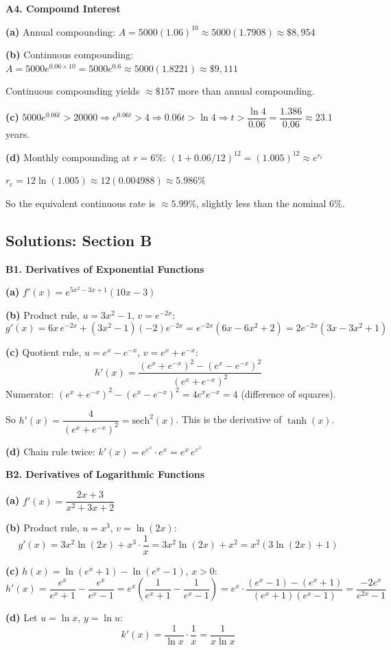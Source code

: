 \documentclass[12pt, a4paper]{article}
\theoremstyle{definition}
\begin{document}
\begin{solbox}
\textbf{A4. Compound Interest}

\textbf{(a)} Annual compounding: $A = 5000(1.06)^{10} \approx 5000(1.7908) \approx \$8{,}954$

\textbf{(b)} Continuous compounding: $A = 5000e^{0.06\times10} = 5000e^{0.6} \approx 5000(1.8221) \approx \$9{,}111$

Continuous compounding yields $\approx\$157$ more than annual compounding.

\textbf{(c)} $5000e^{0.06t} > 20000 \Rightarrow e^{0.06t} > 4 \Rightarrow 0.06t > \ln 4 \Rightarrow t > \dfrac{\ln 4}{0.06} = \dfrac{1.386}{0.06} \approx 23.1$ years.

\textbf{(d)} Monthly compounding at $r=6\%$: $(1+0.06/12)^{12} = (1.005)^{12} \approx e^{r_c}$

$r_c = 12\ln(1.005) \approx 12(0.004988) \approx 5.986\%$

So the equivalent continuous rate is $\approx 5.99\%$, slightly less than the nominal 6\%.
\end{solbox}

\subsection{Solutions: Section B}

\begin{solbox}
\textbf{B1. Derivatives of Exponential Functions}

\textbf{(a)} $f'(x) = e^{5x^2-3x+1}(10x-3)$

\textbf{(b)} Product rule, $u=3x^2-1$, $v=e^{-2x}$:
\[
  g'(x) = 6x\,e^{-2x} + (3x^2-1)(-2)e^{-2x} = e^{-2x}(6x-6x^2+2) = 2e^{-2x}(3x-3x^2+1)
\]

\textbf{(c)} Quotient rule, $u=e^x-e^{-x}$, $v=e^x+e^{-x}$:
\[
  h'(x) = \frac{(e^x+e^{-x})^2 - (e^x-e^{-x})^2}{(e^x+e^{-x})^2}
\]
Numerator: $(e^x+e^{-x})^2-(e^x-e^{-x})^2 = 4e^xe^{-x} = 4$ (difference of squares).

So $h'(x) = \dfrac{4}{(e^x+e^{-x})^2} = \text{sech}^2(x)$. This is the derivative of $\tanh(x)$.

\textbf{(d)} Chain rule twice: $k'(x) = e^{e^x} \cdot e^x = e^x\,e^{e^x}$
\end{solbox}

\begin{solbox}
\textbf{B2. Derivatives of Logarithmic Functions}

\textbf{(a)} $f'(x) = \dfrac{2x+3}{x^2+3x+2}$

\textbf{(b)} Product rule, $u=x^3$, $v=\ln(2x)$:
\[
  g'(x) = 3x^2\ln(2x) + x^3\cdot\frac{1}{x} = 3x^2\ln(2x) + x^2 = x^2(3\ln(2x)+1)
\]

\textbf{(c)} $h(x)=\ln(e^x+1)-\ln(e^x-1)$, $x>0$:
\[
  h'(x) = \frac{e^x}{e^x+1} - \frac{e^x}{e^x-1}
         = e^x\left(\frac{1}{e^x+1}-\frac{1}{e^x-1}\right)
         = e^x\cdot\frac{(e^x-1)-(e^x+1)}{(e^x+1)(e^x-1)}
         = \frac{-2e^x}{e^{2x}-1}
\]

\textbf{(d)} Let $u=\ln x$, $y=\ln u$:
\[
  k'(x) = \frac{1}{\ln x}\cdot\frac{1}{x} = \frac{1}{x\ln x}
\]
\end{solbox}
\end{document}
